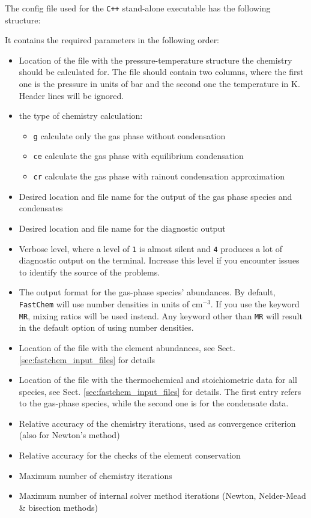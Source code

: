 \documentclass[numbers=noenddot]{aux/fcmanual}
\newcommand{\fc}{\texttt{FastChem}\xspace}
\newcommand{\cpp}{\ttt{C++}\xspace}
\newcommand{\ttt}[1]{\texttt {#1}}
\begin{document}
The config file used for the \cpp stand-alone executable has the following structure:


It contains the required parameters in the following order:
\begin{itemize}
  \item Location of the file with the pressure-temperature structure the chemistry should be calculated for. The file should contain two columns, where the first one is the pressure in units of bar and the second one the temperature in K. Header lines will be ignored.
  \item the type of chemistry calculation:
    \begin{itemize}
    	\item \verb|g| calculate only the gas phase without condensation
    	\item \verb|ce| calculate the gas phase with equilibrium condensation
        \item \verb|cr| calculate the gas phase with rainout condensation approximation
    \end{itemize}
  \item Desired location and file name for the output of the gas phase species and condensates
  \item Desired location and file name for the diagnostic output
  \item Verbose level, where a level of \verb|1| is almost silent and \verb|4| produces a lot of diagnostic output on the terminal. Increase this level if you encounter issues to identify the source of the problems.
  \item The output format for the gas-phase species' abundances. By default, \fc will use number densities in units of cm$^{-3}$. If you use the keyword \verb|MR|, mixing ratios will be used instead. Any keyword other than \verb|MR| will result in the default option of using number densities.
  \item Location of the file with the element abundances, see Sect. \ref{sec:fastchem_input_files} for details
  \item Location of the file with the thermochemical and stoichiometric data for all species, see Sect. \ref{sec:fastchem_input_files} for details. The first entry refers to the gas-phase species, while the second one is for the condensate data. 
  \item Relative accuracy of the chemistry iterations, used as convergence criterion (also for Newton's method)
  \item Relative accuracy for the checks of the element conservation
  \item Maximum number of chemistry iterations
  \item Maximum number of internal solver method iterations (Newton, Nelder-Mead \& bisection methods)
\end{itemize}
\end{document}
